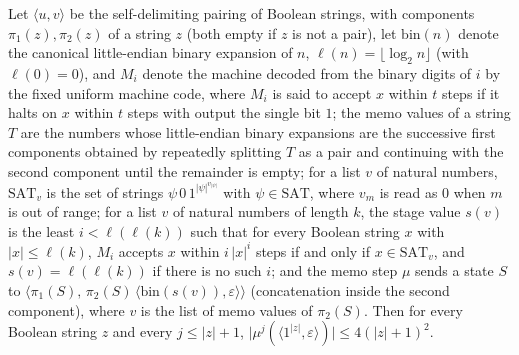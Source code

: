 \begin{theorem}
\label{Complexity.ladner_memo_size}
\leanok
{}
Let $\langle u,v\rangle$ be the self-delimiting pairing of Boolean strings, with components $\pi_1(z),\pi_2(z)$ of a string $z$ (both empty if $z$ is not a pair), let $\mathrm{bin}(n)$ denote the canonical little-endian binary expansion of $n$, $\ell(n)=\lfloor\log_2 n\rfloor$ (with $\ell(0)=0$), and $M_i$ denote the machine decoded from the binary digits of $i$ by the fixed uniform machine code, where $M_i$ is said to accept $x$ within $t$ steps if it halts on $x$ within $t$ steps with output the single bit $1$; the memo values of a string $T$ are the numbers whose little-endian binary expansions are the successive first components obtained by repeatedly splitting $T$ as a pair and continuing with the second component until the remainder is empty; for a list $v$ of natural numbers, $\mathrm{SAT}_v$ is the set of strings $\psi\,0\,1^{|\psi|^{v_{|\psi|}}}$ with $\psi\in\mathrm{SAT}$, where $v_m$ is read as $0$ when $m$ is out of range; for a list $v$ of natural numbers of length $k$, the stage value $s(v)$ is the least $i<\ell(\ell(k))$ such that for every Boolean string $x$ with $|x|\le\ell(k)$, $M_i$ accepts $x$ within $i\,|x|^i$ steps if and only if $x\in\mathrm{SAT}_v$, and $s(v)=\ell(\ell(k))$ if there is no such $i$; and the memo step $\mu$ sends a state $S$ to $\langle\pi_1(S),\,\pi_2(S)\,\langle\mathrm{bin}(s(v)),\varepsilon\rangle\rangle$ (concatenation inside the second component), where $v$ is the list of memo values of $\pi_2(S)$. Then for every
Boolean string $z$ and every $j\le|z|+1$,
$\bigl|\mu^{j}(\langle 1^{|z|},\varepsilon\rangle)\bigr|\le 4(|z|+1)^2$.
\end{theorem}

